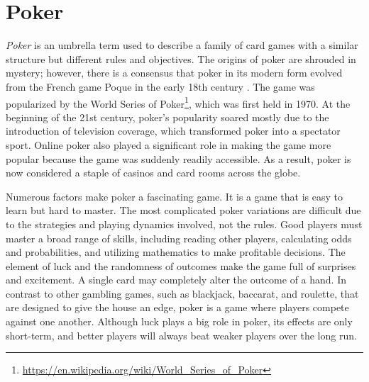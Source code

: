 \section{Poker}
\label{sec:poker}
\textit{Poker} is an umbrella term used to describe a family of card games with a similar structure but different rules and objectives.
The origins of poker are shrouded in mystery; however, there is a consensus \cite{roya_2021} that poker in its modern form evolved from the French game Poque in the early 18th century \cite{williamson2012frontier}.
The game was popularized by the World Series of Poker\footnote{\url{https://en.wikipedia.org/wiki/World_Series_of_Poker}}, which was first held in 1970. At the beginning of the 21st century, poker's popularity soared mostly due to the introduction of television coverage, which transformed poker into a spectator sport. Online poker also played a significant role in making the game more popular because the game was suddenly readily accessible. As a result, poker is now considered a staple of casinos and card rooms across the globe.

Numerous factors make poker a fascinating game. It is a game that is easy to learn but hard to master. The most complicated poker variations are difficult due to the strategies and playing dynamics involved, not the rules. Good players must master a broad range of skills, including reading other players, calculating odds and probabilities, and utilizing mathematics to make profitable decisions. The element of luck and the randomness of outcomes make the game full of surprises and excitement. A single card may completely alter the outcome of a hand. In contrast to other gambling games, such as blackjack, baccarat, and roulette, that are designed to give the house an edge, poker is a game where players compete against one another. Although luck plays a big role in poker, its effects are only short-term, and better players will always beat weaker players over the long run.

